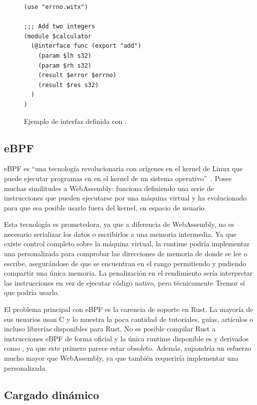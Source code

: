 \begin{figure}
    \centering
    \begin{verbatim}
(use "errno.witx")

;;; Add two integers
(module $calculator
  (@interface func (export "add")
    (param $lh s32)
    (param $rh s32)
    (result $error $errno)
    (result $res s32)
  )
)
    \end{verbatim}
    \caption{Ejemplo de interfaz definida con .}%
    \label{fig:witx_example}
\end{figure}

\subsection{eBPF}

eBPF es ``una tecnología revolucionaria con orígenes en el kernel de Linux que
puede ejecutar programas en \sandbox en el kernel de un sistema
operativo''~\cite{ebpf}. Posee muchas similitudes a WebAssembly: funciona
definiendo una serie de instrucciones que pueden ejecutarse por una máquina
virtual y ha evolucionado para que sea posible usarlo fuera del kernel, en
espacio de usuario.

Esta tecnología es prometedora, ya que a diferencia de WebAssembly, no es
necesario serializar los datos o escribirlos a una memoria intermedia. Ya que
existe control completo sobre la máquina virtual, la runtime podría implementar
una \sandbox personalizada para comprobar las direcciones de memoria de donde se
lee o escribe, asegurándose de que se encuentran en el rango permitiendo y
pudiendo compartir una única memoria. La penalización en el rendimiento sería
interpretar las instrucciones en vez de ejecutar código nativo, pero
técnicamente Tremor sí que podría usarlo.

El problema principal con eBPF es la carencia de soporte en Rust. La mayoría de
sus usuarios usan C y lo muestra la poca cantidad de tutoriales, guías,
artículos o incluso librerías disponibles para Rust. No es posible compilar Rust
a instrucciones eBPF de forma oficial y la única runtime disponible es
 y derivados como , ya que este primero
parece estar obsoleto. Además, supondría un esfuerzo mucho mayor que
WebAssembly, ya que también requeriría implementar una \sandbox personalizada.

\subsection{Cargado dinámico}\label{sec:dynload}


